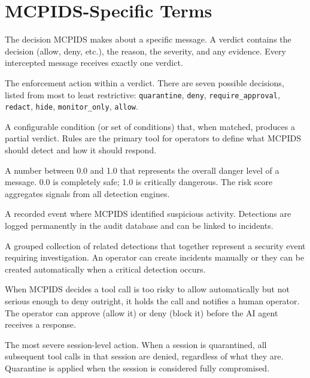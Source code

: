 \documentclass[12pt,a4paper]{report}
\begin{document}
\section{MCPIDS-Specific Terms}

\begin{description}[leftmargin=0pt]

  \item[\textbf{Verdict.}] The decision MCPIDS makes about a specific message.
    A verdict contains the decision (allow, deny, etc.), the reason, the
    severity, and any evidence. Every intercepted message receives exactly
    one verdict.

  \item[\textbf{Decision.}] The enforcement action within a verdict. There
    are seven possible decisions, listed from most to least restrictive:
    \texttt{quarantine}, \texttt{deny}, \texttt{require\_approval},
    \texttt{redact}, \texttt{hide}, \texttt{monitor\_only}, \texttt{allow}.

  \item[\textbf{Rule.}] A configurable condition (or set of conditions) that,
    when matched, produces a partial verdict. Rules are the primary tool for
    operators to define what MCPIDS should detect and how it should respond.

  \item[\textbf{Risk Score.}] A number between 0.0 and 1.0 that represents
    the overall danger level of a message. 0.0 is completely safe; 1.0 is
    critically dangerous. The risk score aggregates signals from all
    detection engines.

  \item[\textbf{Detection.}] A recorded event where MCPIDS identified
    suspicious activity. Detections are logged permanently in the audit
    database and can be linked to incidents.

  \item[\textbf{Incident.}] A grouped collection of related detections that
    together represent a security event requiring investigation. An operator
    can create incidents manually or they can be created automatically when
    a critical detection occurs.

  \item[\textbf{Approval.}] When MCPIDS decides a tool call is too risky
    to allow automatically but not serious enough to deny outright, it holds
    the call and notifies a human operator. The operator can approve (allow
    it) or deny (block it) before the AI agent receives a response.

  \item[\textbf{Quarantine.}] The most severe session-level action. When a
    session is quarantined, all subsequent tool calls in that session are
    denied, regardless of what they are. Quarantine is applied when the
    session is considered fully compromised.

\end{description}
\end{document}
